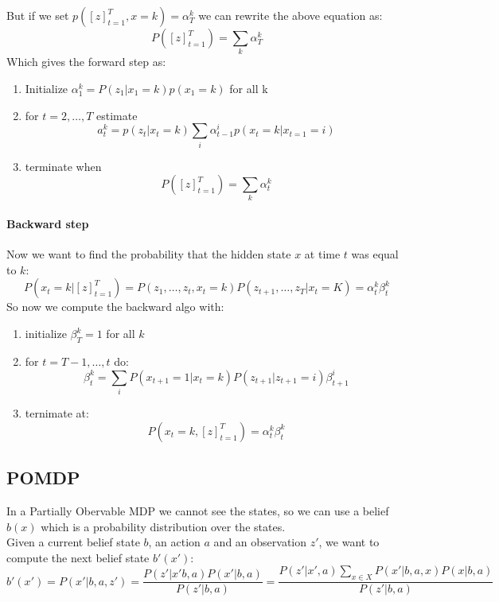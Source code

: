  But if we set  $p([z]_{t=1}^T,x=k)=\alpha_T^k$ we can rewrite the above equation as:
 $$P([z]_{t=1}^T)=\sum_k\alpha_T^k$$
 Which gives the forward step as:
 \begin{enumerate}
 \item Initialize $\alpha_1^k=P(z_1|x_1=k)p(x_1=k)$ for all k
 \item for $t=2,\dots,T$ estimate 
 $$a_t^k=p(z_t|x_t=k)\sum_i \alpha_{t-1}^ip(x_t=k|x_{t=1}=i)$$
 \item terminate when 
 $$P([z]_{t=1}^T)=\sum_k\alpha^k_t$$
  \end{enumerate}

 \paragraph{Backward step}
 Now we want to find the probability that the hidden state $x$ at time $t$ was equal to $k$:
 $$P(x_t=k|[z]_{t=1}^T)=P(z_1,\dots,z_t,x_t=k)P(z_{t+1},\dots,z_T|x_t=K)=\alpha^k_t\beta_t^k$$
 So now we compute the backward algo with:
 \begin{enumerate}
 \item initialize $\beta_T^k=1$ for all $k$
 \item for $t=T-1,\dots,t$ do:
 $$\beta_t^k=\sum_i P(x_{t+1}=1|x_t=k)P(z_{t+1}|z_{t+1}=i)\beta^i_{t+1}$$
 \item ternimate at:
 $$P(x_t=k,[z]_{t=1}^T)=\alpha^k_t\beta^k_t$$
 \end{enumerate}
 
 \subsection{POMDP}
 In a Partially Obervable MDP we cannot see the states, so we can use a belief $b(x)$ which is a probability distribution over the states.\\
 Given a current belief state $b$, an action $a$ and an observation $z'$, we want to compute the next belief state $b'(x')$:
 $$b'(x')=P(x'|b,a,z')=\frac{P(z'|x'b,a)P(x'|b,a)}{P(z'|b,a)}=\frac{P(z'|x',a)\sum_{x\in X}P(x'|b,a,x)P(x|b,a)}{P(z'|b,a)}$$
 

 